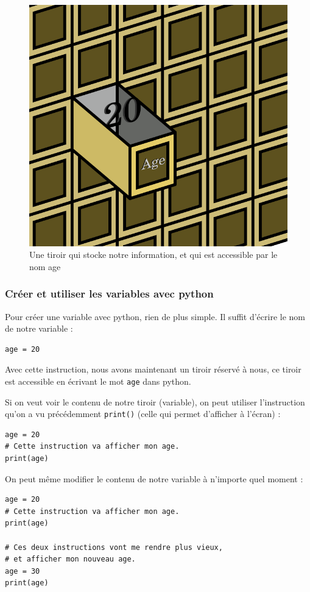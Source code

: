 \documentclass[12pt]{article}
\newcommand{\code}[1]{\colorbox{light-gray}{\texttt{#1}}}
\begin{document}
        \begin{figure}[H]
            \centering
            \includegraphics[width=0.5\linewidth]{img/14_variable.png}
            \caption{Une tiroir qui stocke notre information, et qui est accessible par le nom age}
        \end{figure}

        \subsubsection{Créer et utiliser les variables avec python}
            Pour créer une variable avec python, rien de plus simple. Il suffit d'écrire le nom de notre variable :
            \begin{lstlisting}[style=code]
age = 20 
            \end{lstlisting}

            Avec cette instruction, nous avons maintenant un tiroir réservé à nous, ce tiroir est accessible en
            écrivant le mot \code{age} dans python. 

            Si on veut voir le contenu de notre tiroir (variable), on peut utiliser 
            l'instruction qu'on a vu précédemment \code{print()} (celle qui permet d'afficher à l'écran) :
            \begin{lstlisting}[style=code]
age = 20
# Cette instruction va afficher mon age.
print(age) 
            \end{lstlisting}

            On peut même modifier le contenu de notre variable à n'importe quel moment :
            \begin{lstlisting}[style=code]
age = 20
# Cette instruction va afficher mon age.
print(age) 

# Ces deux instructions vont me rendre plus vieux, 
# et afficher mon nouveau age.
age = 30
print(age)
            \end{lstlisting}
\end{document}
